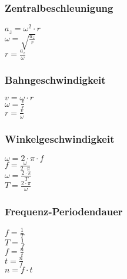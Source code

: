 \subsubsection{Zentralbeschleunigung} 
\begin{minipage}{0.45\textwidth} 
$ a_{z}  = \omega ^{2} \cdot r $\\ 
$ \omega  = \sqrt{\frac{a_{z} }{r}} $\\ 
$ r = \frac{a_{z} }{\omega } $\\ 
\end{minipage} 
\begin{minipage}{0.45\textwidth} 
 
\end{minipage} 
\subsubsection{Bahngeschwindigkeit} 
\begin{minipage}{0.45\textwidth} 
$ v = \omega \cdot r $\\ 
$ \omega  = \frac{v}{r} $\\ 
$ r = \frac{v}{\omega } $\\ 
\end{minipage} 
\begin{minipage}{0.45\textwidth} 
 
\end{minipage} 
\subsubsection{Winkelgeschwindigkeit} 
\begin{minipage}{0.45\textwidth} 
$ \omega  = 2\cdot \pi \cdot f $\\ 
$ f = \frac{\omega }{2\cdot \pi } $\\ 
$ \omega  = \frac{2\cdot \pi }{ T} $\\ 
$ T = \frac{2\cdot \pi }{ \omega } $\\ 
\end{minipage} 
\begin{minipage}{0.45\textwidth} 
 
\end{minipage} 
\subsubsection{Frequenz-Periodendauer} 
\begin{minipage}{0.45\textwidth} 
$ f = \frac{1}{T} $\\ 
$ T = \frac{1}{f} $\\ 
$ f = \frac{n}{t} $\\ 
$ t = \frac{n}{f} $\\ 
$ n = f\cdot t $\\ 
\end{minipage} 
\begin{minipage}{0.45\textwidth} 
 
\end{minipage} 
